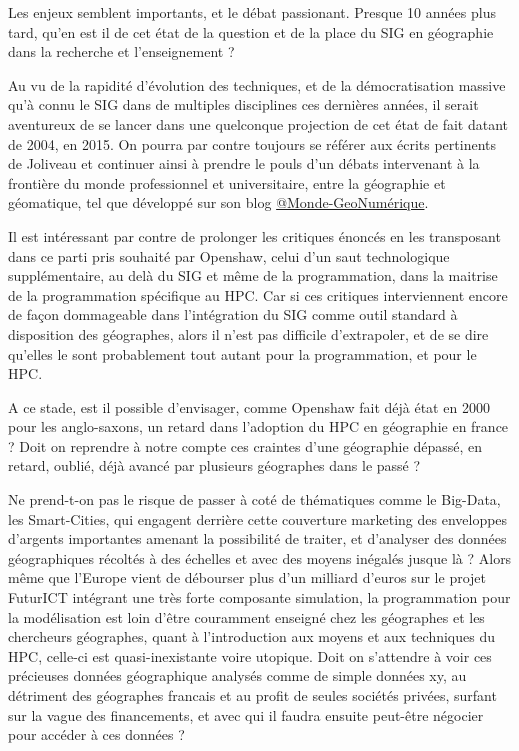 
Les enjeux semblent importants, et le débat passionant. Presque 10 années plus tard, qu'en est il de cet état de la question et de la place du SIG en géographie dans la recherche et l'enseignement ?

Au vu de la rapidité d'évolution des techniques, et de la démocratisation massive qu'à connu le SIG dans de multiples disciplines ces dernières années, il serait aventureux de se lancer dans une quelconque projection de cet état de fait datant de 2004, en 2015. On pourra par contre toujours se référer aux écrits pertinents de Joliveau et continuer ainsi à prendre le pouls d'un débats intervenant à la frontière du monde professionnel et universitaire, entre la géographie et géomatique, tel que développé sur son blog \href{https://mondegeonumerique.wordpress.com/}{@Monde-GeoNumérique}.

Il est intéressant par contre de prolonger les critiques énoncés en les transposant dans ce parti pris souhaité par Openshaw, celui d'un saut technologique supplémentaire, au delà du SIG et même de la programmation, dans la maitrise de la programmation spécifique au HPC. Car si ces critiques interviennent encore de façon dommageable dans l'intégration du SIG comme outil standard à disposition des géographes, alors il n'est pas difficile d'extrapoler, et de se dire qu'elles le sont probablement tout autant pour la programmation, et pour le HPC.

A ce stade, est il possible d'envisager, comme Openshaw fait déjà état en 2000 pour les anglo-saxons, un retard dans l'adoption du HPC en géographie en france ? Doit on reprendre à notre compte ces craintes d'une géographie dépassé, en retard, oublié, déjà avancé par plusieurs géographes dans le passé  ?

Ne prend-t-on pas le risque de passer à coté de thématiques comme le Big-Data, les Smart-Cities, qui engagent derrière cette couverture marketing des enveloppes d'argents importantes amenant la possibilité de traiter, et d’analyser des données géographiques récoltés à des échelles et avec des moyens inégalés jusque là ? Alors même que l’Europe vient de débourser plus d'un milliard d’euros sur le projet FuturICT intégrant une très forte composante simulation, la programmation pour la modélisation est loin d’être couramment enseigné chez les géographes et les chercheurs géographes, quant à l'introduction aux moyens et aux techniques du HPC, celle-ci est quasi-inexistante voire utopique. Doit on s’attendre à voir ces précieuses données géographique analysés comme de simple données xy, au détriment des géographes francais et au profit de seules sociétés privées, surfant sur la vague des financements, et avec qui il faudra ensuite peut-être négocier pour accéder à ces données ?

